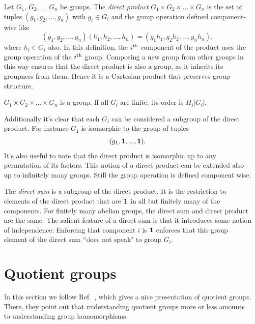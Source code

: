 Let $G_1$, $G_2$, ... $G_n$ be groups. The
{\it direct product} 
$G_1\times G_2\times ...\times G_n$
is the set of tuples $(g_1,g_2,...,g_n)$ with $g_i\in G_i$
and the group operation defined component-wise like
\begin{equation}
(g_1,g_2,...,g_n)(h_1,h_2,...,h_n)
=(g_1h_1, g_2h_2,...,g_nh_n),
\end{equation}
where $h_i\in G_i$ also.
In this definition, the $i{}^{\rm th}$ component of the product
uses the group operation of the $i{}^{\rm th}$ group. Composing
a new group from other groups in this way ensures that
the direct product is also a group, as it inherits its
groupness from them. Hence it is a Cartesian product
that preserves group structure.

\begin{proposition}{}{}
$G_1\times G_2\times ...\times G_n$ is a group.
If all $G_i$ are finite, its order is $\Pi_i |G_i|$.
\end{proposition}

Additionally it's clear that each $G_i$ can be considered
a subgroup of the direct product. For instance $G_1$ is
isomorphic to the group of tuples
\begin{equation}
(g_1,{\mathbf 1},...,{\mathbf 1}).
\end{equation}
It's also useful to note that the direct product is
isomorphic up to any permutation of its factors.
This notion of a direct product can be extended also
up to infinitely many groups. Still the group operation
is defined component wise. 

The {\it direct sum} is a subgroup
of the direct product. It is the restriction to elements of
the direct product that are ${\mathbf 1}$ in all but finitely
many of the components. For finitely many abelian groups,
the direct sum and direct product are the same. The
salient feature of a direct sum is that it introduces
some notion of independence: Enforcing that component $i$
is ${\mathbf 1}$ enforces that this group element of the
direct sum ``does not speak" to group $G_i$.


\section{Quotient groups}\label{sec:q}

In this section we follow Ref.~\cite{dummit_abstract_2004}, which gives a nice
presentation of quotient groups. There, they point out that understanding
quotient groups more or less amounts to understanding group homomorphisms.

